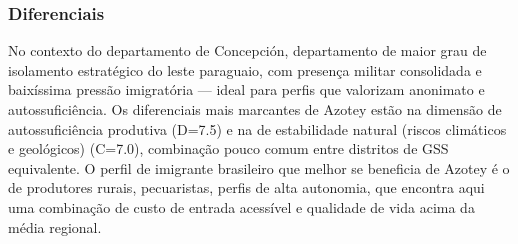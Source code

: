 \subsubsection*{Diferenciais}\label{dif-azotey-0104}
No contexto do departamento de Concepción, departamento de maior grau de isolamento estratégico do leste paraguaio, com presença militar consolidada e baixíssima pressão imigratória — ideal para perfis que valorizam anonimato e autossuficiência. Os diferenciais mais marcantes de Azotey estão na dimensão de autossuficiência produtiva (D=7.5) e na de estabilidade natural (riscos climáticos e geológicos) (C=7.0), combinação pouco comum entre distritos de GSS equivalente. O perfil de imigrante brasileiro que melhor se beneficia de Azotey é o de produtores rurais, pecuaristas, perfis de alta autonomia, que encontra aqui uma combinação de custo de entrada acessível e qualidade de vida acima da média regional.
